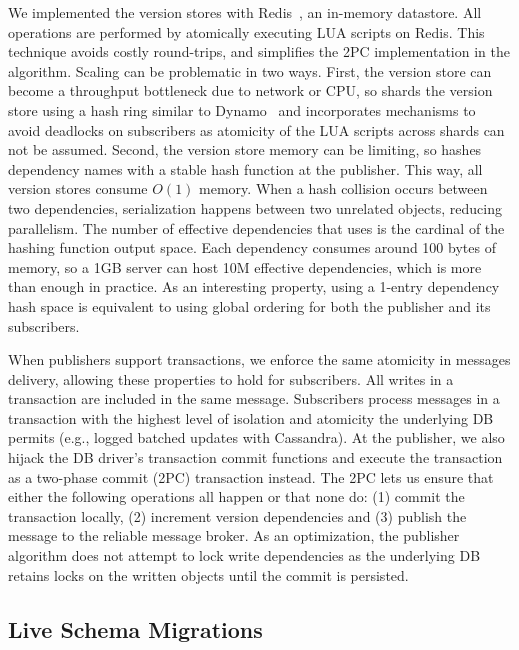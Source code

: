  \label{synapse:sec:arch:hashing}
We implemented the version stores with Redis~\cite{redis}, an in-memory
datastore. All \synapse operations are performed by atomically executing LUA scripts
on Redis. This technique avoids costly round-trips, and simplifies the 2PC
implementation in the algorithm. Scaling can be problematic in two ways.
First, the version store can become a throughput bottleneck due to
network or CPU, so \synapse shards the version store using a hash
ring similar to Dynamo~\cite{paper:dynamo} and incorporates mechanisms to avoid
deadlocks on subscribers as atomicity of the LUA scripts across shards
can not be assumed. 
Second, the version store memory can be limiting, so \synapse hashes
dependency names with a stable hash function at the publisher. This way,
all version stores consume $O(1)$ memory.
When a hash collision occurs between two dependencies, serialization happens
between two unrelated objects, reducing parallelism.
The number of effective dependencies that \synapse uses is the cardinal of the
hashing function output space.
Each dependency consumes around 100 bytes of memory, so a 1GB server can host
10M effective dependencies, which is more than enough in practice.
As an interesting property, using a 1-entry dependency hash space is equivalent
to using global ordering for both the publisher and its subscribers.

\label{synapse:sec:arch:transactions}
When publishers support transactions, we enforce the same atomicity in messages delivery, allowing these properties to hold for subscribers.  All
writes in a transaction are included in the same message.
Subscribers process messages in a transaction with the highest level of isolation
and atomicity the underlying DB permits (e.g., logged batched updates with Cassandra).
At the publisher, we also hijack the DB driver's transaction commit functions and
execute the transaction as a two-phase commit (2PC) transaction instead.  The
2PC lets us ensure that either the following operations all happen or that none do:
(1) commit the transaction locally, (2) increment version dependencies and (3)
publish the message to the reliable message broker. As an optimization,
the publisher algorithm does not attempt to lock write dependencies as the
underlying DB retains locks on the written objects until the commit is persisted.

\subsection{Live Schema Migrations} \label{synapse:sec:arch:migations}

